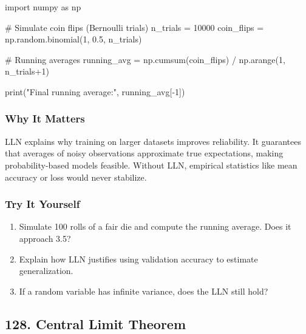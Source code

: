 \documentclass[
  letterpaper,
  DIV=11,
  numbers=noendperiod]{scrreprt}
\newenvironment{Shaded}{\begin{snugshade}}{\end{snugshade}}
\newcommand{\BuiltInTok}[1]{\textcolor[rgb]{0.00,0.23,0.31}{#1}}
\newcommand{\CommentTok}[1]{\textcolor[rgb]{0.37,0.37,0.37}{#1}}
\newcommand{\DecValTok}[1]{\textcolor[rgb]{0.68,0.00,0.00}{#1}}
\newcommand{\FloatTok}[1]{\textcolor[rgb]{0.68,0.00,0.00}{#1}}
\newcommand{\ImportTok}[1]{\textcolor[rgb]{0.00,0.46,0.62}{#1}}
\newcommand{\NormalTok}[1]{\textcolor[rgb]{0.00,0.23,0.31}{#1}}
\newcommand{\OperatorTok}[1]{\textcolor[rgb]{0.37,0.37,0.37}{#1}}
\newcommand{\StringTok}[1]{\textcolor[rgb]{0.13,0.47,0.30}{#1}}
\providecommand{\tightlist}{%
  \setlength{\itemsep}{0pt}\setlength{\parskip}{0pt}}
\begin{document}
\begin{Shaded}
\begin{Highlighting}[]
\ImportTok{import}\NormalTok{ numpy }\ImportTok{as}\NormalTok{ np}

\CommentTok{\# Simulate coin flips (Bernoulli trials)}
\NormalTok{n\_trials }\OperatorTok{=} \DecValTok{10000}
\NormalTok{coin\_flips }\OperatorTok{=}\NormalTok{ np.random.binomial(}\DecValTok{1}\NormalTok{, }\FloatTok{0.5}\NormalTok{, n\_trials)}

\CommentTok{\# Running averages}
\NormalTok{running\_avg }\OperatorTok{=}\NormalTok{ np.cumsum(coin\_flips) }\OperatorTok{/}\NormalTok{ np.arange(}\DecValTok{1}\NormalTok{, n\_trials}\OperatorTok{+}\DecValTok{1}\NormalTok{)}

\BuiltInTok{print}\NormalTok{(}\StringTok{"Final running average:"}\NormalTok{, running\_avg[}\OperatorTok{{-}}\DecValTok{1}\NormalTok{])}
\end{Highlighting}
\end{Shaded}

\subsubsection{Why It Matters}\label{why-it-matters-24}

LLN explains why training on larger datasets improves reliability. It
guarantees that averages of noisy observations approximate true
expectations, making probability-based models feasible. Without LLN,
empirical statistics like mean accuracy or loss would never stabilize.

\subsubsection{Try It Yourself}\label{try-it-yourself-126}

\begin{enumerate}
\def\labelenumi{\arabic{enumi}.}
\tightlist
\item
  Simulate 100 rolls of a fair die and compute the running average. Does
  it approach 3.5?
\item
  Explain how LLN justifies using validation accuracy to estimate
  generalization.
\item
  If a random variable has infinite variance, does the LLN still hold?
\end{enumerate}

\subsection{128. Central Limit Theorem}\label{central-limit-theorem}
\end{document}
